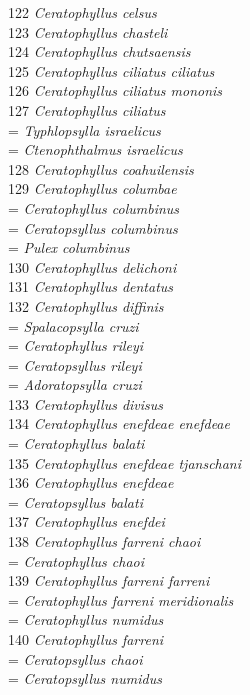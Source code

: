 \documentclass[
]{article}
\begin{document}
122 \emph{Ceratophyllus celsus}\\
123 \emph{Ceratophyllus chasteli}\\
124 \emph{Ceratophyllus chutsaensis}\\
125 \emph{Ceratophyllus ciliatus ciliatus}\\
126 \emph{Ceratophyllus ciliatus mononis}\\
127 \emph{Ceratophyllus ciliatus}\\
= \emph{Typhlopsylla israelicus}\\
= \emph{Ctenophthalmus israelicus}\\
128 \emph{Ceratophyllus coahuilensis}\\
129 \emph{Ceratophyllus columbae}\\
= \emph{Ceratophyllus columbinus}\\
= \emph{Ceratopsyllus columbinus}\\
= \emph{Pulex columbinus}\\
130 \emph{Ceratophyllus delichoni}\\
131 \emph{Ceratophyllus dentatus}\\
132 \emph{Ceratophyllus diffinis}\\
= \emph{Spalacopsylla cruzi}\\
= \emph{Ceratophyllus rileyi}\\
= \emph{Ceratopsyllus rileyi}\\
= \emph{Adoratopsylla cruzi}\\
133 \emph{Ceratophyllus divisus}\\
134 \emph{Ceratophyllus enefdeae enefdeae}\\
= \emph{Ceratophyllus balati}\\
135 \emph{Ceratophyllus enefdeae tjanschani}\\
136 \emph{Ceratophyllus enefdeae}\\
= \emph{Ceratopsyllus balati}\\
137 \emph{Ceratophyllus enefdei}\\
138 \emph{Ceratophyllus farreni chaoi}\\
= \emph{Ceratophyllus chaoi}\\
139 \emph{Ceratophyllus farreni farreni}\\
= \emph{Ceratophyllus farreni meridionalis}\\
= \emph{Ceratophyllus numidus}\\
140 \emph{Ceratophyllus farreni}\\
= \emph{Ceratopsyllus chaoi}\\
= \emph{Ceratopsyllus numidus}\\
\end{document}
